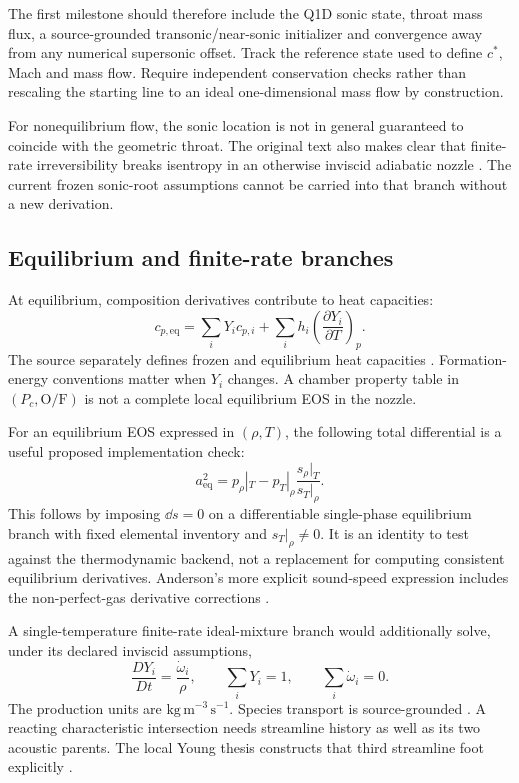 The first milestone should therefore include the Q1D sonic state,
throat mass flux, a source-grounded transonic/near-sonic initializer and
convergence away from any numerical supersonic offset. Track the reference
state used to define \(c^*\), Mach and mass flow. Require independent
conservation checks rather than rescaling the starting line to an ideal
one-dimensional mass flow by construction.

For nonequilibrium flow, the sonic location is not in general guaranteed
to coincide with the geometric throat. The original text also makes
clear that finite-rate irreversibility breaks isentropy in an otherwise
inviscid adiabatic nozzle \cite[\S17.11, PDF p.~704]{anderson}. The
current frozen sonic-root assumptions cannot be carried into that
branch without a new derivation.

\subsection{Equilibrium and finite-rate branches}
At equilibrium, composition derivatives contribute to heat capacities:
\begin{equation}
c_{p,\mathrm{eq}}
=\sum_iY_i c_{p,i}
+\sum_i h_i\left(\frac{\partial Y_i}{\partial T}\right)_p .
\end{equation}
The source separately defines frozen and equilibrium heat capacities
\cite[PDF p.~678, Eqs.~17.20--17.25]{anderson}.
Formation-energy conventions matter when \(Y_i\) changes. A chamber
property table in \((P_c,\mathrm{O/F})\) is not a complete
local equilibrium EOS in the nozzle.

For an equilibrium EOS expressed in \((\rho,T)\), the following total
differential is a useful proposed implementation check:
\begin{equation}
a_{\mathrm{eq}}^2
=p_\rho|_T-p_T|_\rho\frac{s_\rho|_T}{s_T|_\rho}.
\end{equation}
This follows by imposing \(\dd s=0\) on a differentiable single-phase
equilibrium branch with fixed elemental inventory and \(s_T|_\rho\ne0\).
It is an identity to test against the thermodynamic backend,
not a replacement for computing consistent equilibrium derivatives.
Anderson's more explicit sound-speed expression includes the
non-perfect-gas derivative corrections \cite[PDF p.~682, Eq.~17.35]{anderson}.

A single-temperature finite-rate ideal-mixture branch would additionally
solve, under its declared inviscid assumptions,
\begin{equation}
\frac{D Y_i}{Dt}=\frac{\dot\omega_i}{\rho},\qquad
\sum_iY_i=1,\qquad \sum_i\dot\omega_i=0.
\end{equation}
The production units are \(\mathrm{kg\,m^{-3}\,s^{-1}}\).
Species transport is source-grounded
\cite[PDF p.~687, Eq.~17.42]{anderson}. A reacting
characteristic intersection needs streamline history as well as its
two acoustic parents. The local Young thesis constructs that third
streamline foot explicitly \cite[PDF pp.~91--96]{young}.

